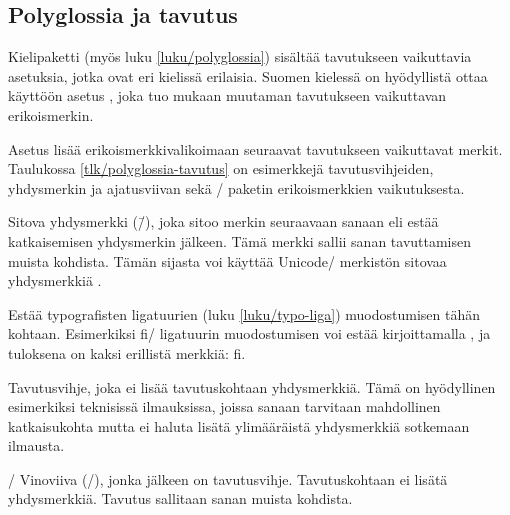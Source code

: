 \subsection{Polyglossia ja tavutus}
\label{luku/tavutus-polyglossia}

Kielipaketti  (myös luku
\ref{luku/polyglossia}) sisältää tavutukseen vaikuttavia asetuksia,
jotka ovat eri kielissä erilaisia. Suomen kielessä on hyödyllistä ottaa
käyttöön asetus , joka tuo mukaan muutaman
tavutukseen vaikuttavan erikoismerkin.

\begin{koodilohkosis}
\setdefaultlanguage[babelshorthands]{finnish}
\end{koodilohkosis}

\noindent
Asetus  lisää erikoismerkkivalikoimaan seuraavat
tavutukseen vaikuttavat merkit. Taulukossa \ref{tlk/polyglossia-tavutus}
on esimerkkejä tavutusvihjeiden, yhdysmerkin ja ajatusviivan sekä
\-/ paketin erikoismerkkien vaikutuksesta.

\newcommand{\shorthandsyhdysmerkki}{%
\item [\textquotedbl-] Sitova yhdysmerkki (\=/), joka sitoo merkin
  seuraavaan sanaan eli estää katkaisemisen yhdysmerkin jälkeen. Tämä
  merkki sallii sanan tavuttamisen muista kohdista. Tämän sijasta voi
  käyttää Unicode\-/ merkistön sitovaa yhdysmerkkiä \uctunnus{u+2011
    non\-/ breaking hyphen}.}

\newcommand{\shorthandspystyviiva}{%
\item [\textquotedbl|] Estää typografisten ligatuurien (luku
  \ref{luku/typo-liga}) muodostumisen tähän kohtaan. Esimerkiksi fi\-/
  ligatuurin muodostumisen voi estää kirjoittamalla \koodi{f"|i}, ja
  tuloksena on kaksi erillistä merkkiä: f\textcompwordmark i.}

\newcommand{\shorthandslainausmerkki}{%
\item [\textquotedbl\textquotedbl] Tavutusvihje, joka ei lisää
  tavutuskohtaan yhdysmerkkiä. Tämä on hyödyllinen esimerkiksi
  teknisissä ilmauksissa, joissa sanaan tarvitaan mahdollinen
  katkaisukohta mutta ei haluta lisätä ylimääräistä yhdysmerkkiä
  sotkemaan ilmausta.}

\begin{maaritelma}{}
  \shorthandsyhdysmerkki


  \shorthandspystyviiva

  \shorthandslainausmerkki

\item [\textquotedbl/] Vinoviiva (/), jonka jälkeen on tavutusvihje.
  Tavutuskohtaan ei lisätä yhdysmerkkiä. Tavutus sallitaan sanan muista
  kohdista.
\end{maaritelma}

